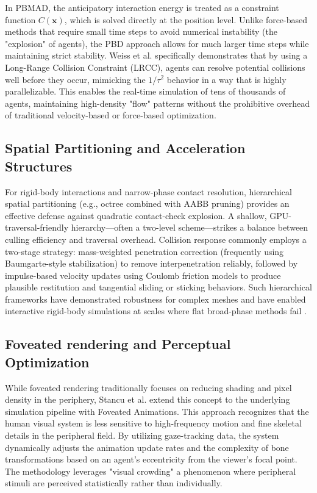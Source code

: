 In PBMAD, the anticipatory interaction energy is treated as a constraint function $C(\mathbf{x})$, which is solved directly at the position level. Unlike force-based methods that require small time steps to avoid numerical instability (the "explosion" of agents), the PBD approach allows for much larger time steps while maintaining strict stability. Weiss et al. \cite{weiss2019} specifically demonstrates that by using a Long-Range Collision Constraint (LRCC), agents can resolve potential collisions well before they occur, mimicking the $1/\tau^2$ behavior in a way that is highly parallelizable. This enables the real-time simulation of tens of thousands of agents, maintaining high-density "flow" patterns without the prohibitive overhead of traditional velocity-based or force-based optimization.

\subsection{Spatial Partitioning and Acceleration Structures} %
For rigid-body interactions and narrow-phase contact resolution, hierarchical spatial partitioning (e.g., octree combined with AABB pruning) provides an effective defense against quadratic contact-check explosion. A shallow, GPU-traversal-friendly hierarchy—often a two-level scheme—strikes a balance between culling efficiency and traversal overhead. Collision response commonly employs a two-stage strategy: mass-weighted penetration correction (frequently using Baumgarte-style stabilization) to remove interpenetration reliably, followed by impulse-based velocity updates using Coulomb friction models to produce plausible restitution and tangential sliding or sticking behaviors. Such hierarchical frameworks have demonstrated robustness for complex meshes and have enabled interactive rigid-body simulations at scales where flat broad-phase methods fail \cite{sung}.

\subsection{Foveated rendering and Perceptual Optimization} %
While foveated rendering traditionally focuses on reducing shading and pixel density in the periphery, Stancu et al. \cite{stancu} extend this concept to the underlying simulation pipeline with Foveated Animations. This approach recognizes that the human visual system is less sensitive to high-frequency motion and fine skeletal details in the peripheral field. By utilizing gaze-tracking data, the system dynamically adjusts the animation update rates and the complexity of bone transformations based on an agent's eccentricity from the viewer's focal point. The methodology leverages "visual crowding" a phenomenon where peripheral stimuli are perceived statistically rather than individually.

